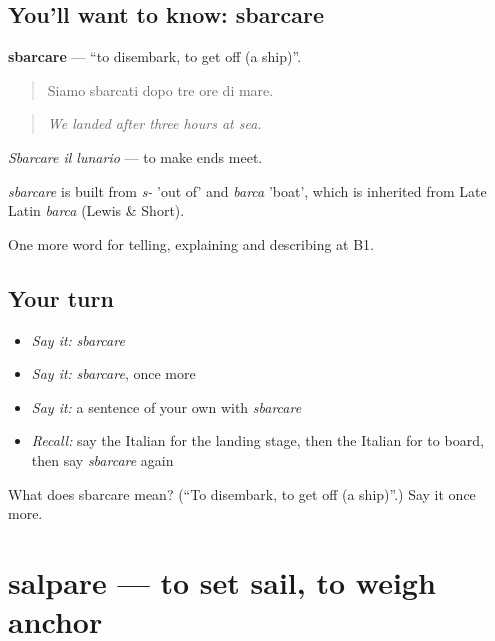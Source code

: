 \subsection*{You'll want to know: sbarcare}
\textbf{sbarcare} — \textquotedblleft{}to disembark, to get off (a ship)\textquotedblright{}.

\begin{quote}
Siamo sbarcati dopo tre ore di mare.
\end{quote}

\begin{quote}
\emph{We landed after three hours at sea.}
\end{quote}

\emph{Sbarcare il lunario} — to make ends meet.

\begin{cousinweb}
\emph{sbarcare} is built from \emph{s-} 'out of' and \emph{barca} 'boat', which is inherited from Late Latin \emph{barca} (Lewis \& Short).
\end{cousinweb}

\begin{grammarlens}[title={What you've built}]
One more word for telling, explaining and describing at B1.
\end{grammarlens}

\subsection*{Your turn}
\begin{itemize}
\raggedright
  \item \emph{Say it:} \emph{sbarcare}
  \item \emph{Say it:} \emph{sbarcare}, once more
  \item \emph{Say it:} a sentence of your own with \emph{sbarcare}
  \item \emph{Recall:} say the Italian for the landing stage, then the Italian for to board, then say \emph{sbarcare} again
\end{itemize}

\begin{tcolorbox}[breakable,colback=teal!4,colframe=teal!35!black,title={Before you move on}]
What does sbarcare mean? (\textquotedblleft{}To disembark, to get off (a ship)\textquotedblright{}.) Say it once more.
\end{tcolorbox}
\section[salpare]{salpare — to set sail, to weigh anchor}

